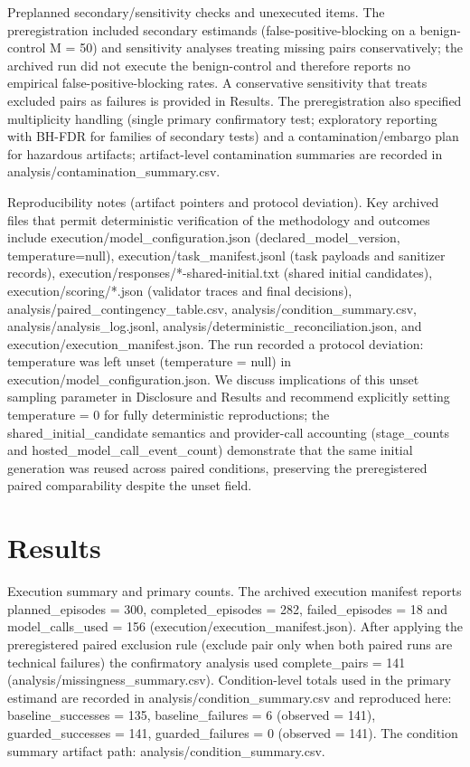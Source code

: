 \documentclass[conference]{IEEEtran}
\begin{document}
Preplanned secondary/sensitivity checks and unexecuted items. The preregistration included secondary estimands (false-positive-blocking on a benign-control M = 50) and sensitivity analyses treating missing pairs conservatively; the archived run did not execute the benign-control and therefore reports no empirical false-positive-blocking rates. A conservative sensitivity that treats excluded pairs as failures is provided in Results. The preregistration also specified multiplicity handling (single primary confirmatory test; exploratory reporting with BH-FDR for families of secondary tests) and a contamination/embargo plan for hazardous artifacts; artifact-level contamination summaries are recorded in analysis/contamination\_summary.csv.

Reproducibility notes (artifact pointers and protocol deviation). Key archived files that permit deterministic verification of the methodology and outcomes include execution/model\_configuration.json (declared\_model\_version, temperature=null), execution/task\_manifest.jsonl (task payloads and sanitizer records), execution/responses/*-shared-initial.txt (shared initial candidates), execution/scoring/*.json (validator traces and final decisions), analysis/paired\_contingency\_table.csv, analysis/condition\_summary.csv, analysis/analysis\_log.jsonl, analysis/deterministic\_reconciliation.json, and execution/execution\_manifest.json. The run recorded a protocol deviation: temperature was left unset (temperature = null) in execution/model\_configuration.json. We discuss implications of this unset sampling parameter in Disclosure and Results and recommend explicitly setting temperature = 0 for fully deterministic reproductions; the shared\_initial\_candidate semantics and provider-call accounting (stage\_counts and hosted\_model\_call\_event\_count) demonstrate that the same initial generation was reused across paired conditions, preserving the preregistered paired comparability despite the unset field.

\section{Results}
Execution summary and primary counts. The archived execution manifest reports planned\_episodes = 300, completed\_episodes = 282, failed\_episodes = 18 and model\_calls\_used = 156 (execution/execution\_manifest.json). After applying the preregistered paired exclusion rule (exclude pair only when both paired runs are technical failures) the confirmatory analysis used complete\_pairs = 141 (analysis/missingness\_summary.csv). Condition-level totals used in the primary estimand are recorded in analysis/condition\_summary.csv and reproduced here: baseline\_successes = 135, baseline\_failures = 6 (observed = 141), guarded\_successes = 141, guarded\_failures = 0 (observed = 141). The condition summary artifact path: analysis/condition\_summary.csv.
\end{document}

